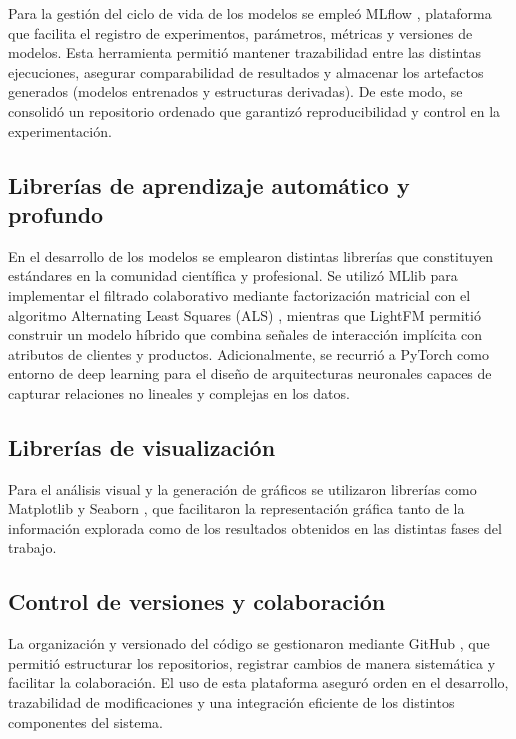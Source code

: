 Para la gestión del ciclo de vida de los modelos se empleó MLflow \cite{ARTICLE:MLflow2018}, plataforma que facilita el registro de experimentos, parámetros, métricas y versiones de modelos. Esta herramienta permitió mantener trazabilidad entre las distintas ejecuciones, asegurar comparabilidad de resultados y almacenar los artefactos generados (modelos entrenados y estructuras derivadas). De este modo, se consolidó un repositorio ordenado que garantizó reproducibilidad y control en la experimentación.

\subsection{Librerías de aprendizaje automático y profundo}

En el desarrollo de los modelos se emplearon distintas librerías que constituyen estándares en la comunidad científica y profesional. Se utilizó MLlib para implementar el filtrado colaborativo mediante factorización matricial con el algoritmo Alternating Least Squares (ALS) \cite{ARTICLE:ALS2008}, mientras que LightFM \cite{ARTICLE:LightFM2015} permitió construir un modelo híbrido que combina señales de interacción implícita con atributos de clientes y productos. Adicionalmente, se recurrió a PyTorch como entorno de deep learning para el diseño de arquitecturas neuronales capaces de capturar relaciones no lineales y complejas en los datos. 

\subsection{Librerías de visualización}

Para el análisis visual y la generación de gráficos se utilizaron librerías como Matplotlib \cite{ARTICLE:Matplotlib2007} y Seaborn \cite{ARTICLE:Seaborn2021}, que facilitaron la representación gráfica tanto de la información explorada como de los resultados obtenidos en las distintas fases del trabajo.

\subsection{Control de versiones y colaboración}

La organización y versionado del código se gestionaron mediante GitHub \cite{ARTICLE:GitHub}, que permitió estructurar los repositorios, registrar cambios de manera sistemática y facilitar la colaboración. El uso de esta plataforma aseguró orden en el desarrollo, trazabilidad de modificaciones y una integración eficiente de los distintos componentes del sistema.

